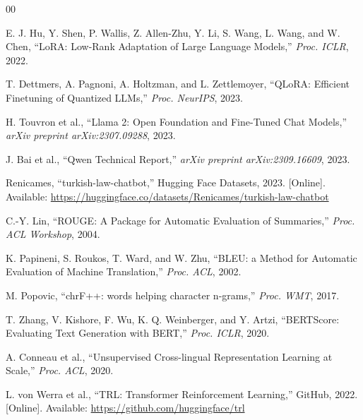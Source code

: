 \documentclass[conference]{IEEEtran}
\begin{document}
\begin{thebibliography}{00}

E. J. Hu, Y. Shen, P. Wallis, Z. Allen-Zhu, Y. Li, S. Wang, L. Wang, and W. Chen,
``LoRA: Low-Rank Adaptation of Large Language Models,''
\textit{Proc. ICLR}, 2022.

T. Dettmers, A. Pagnoni, A. Holtzman, and L. Zettlemoyer,
``QLoRA: Efficient Finetuning of Quantized LLMs,''
\textit{Proc. NeurIPS}, 2023.

H. Touvron et al.,
``Llama 2: Open Foundation and Fine-Tuned Chat Models,''
\textit{arXiv preprint arXiv:2307.09288}, 2023.

J. Bai et al.,
``Qwen Technical Report,''
\textit{arXiv preprint arXiv:2309.16609}, 2023.

Renicames,
``turkish-law-chatbot,''
Hugging Face Datasets, 2023.
[Online]. Available: \url{https://huggingface.co/datasets/Renicames/turkish-law-chatbot}

C.-Y. Lin,
``ROUGE: A Package for Automatic Evaluation of Summaries,''
\textit{Proc. ACL Workshop}, 2004.

K. Papineni, S. Roukos, T. Ward, and W. Zhu,
``BLEU: a Method for Automatic Evaluation of Machine Translation,''
\textit{Proc. ACL}, 2002.

M. Popovic,
``chrF++: words helping character n-grams,''
\textit{Proc. WMT}, 2017.

T. Zhang, V. Kishore, F. Wu, K. Q. Weinberger, and Y. Artzi,
``BERTScore: Evaluating Text Generation with BERT,''
\textit{Proc. ICLR}, 2020.

A. Conneau et al.,
``Unsupervised Cross-lingual Representation Learning at Scale,''
\textit{Proc. ACL}, 2020.

L. von Werra et al.,
``TRL: Transformer Reinforcement Learning,''
GitHub, 2022.
[Online]. Available: \url{https://github.com/huggingface/trl}

\end{thebibliography}
\end{document}

